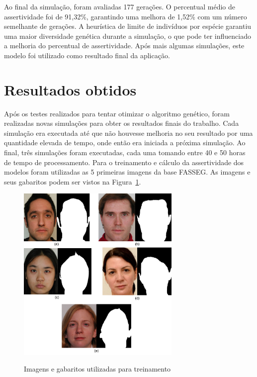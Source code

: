 \documentclass[12pt,oneside,a4paper,english,french,spanish,brazil,]{abntex2}
\begin{document}
Ao final da simulação, foram avaliadas 177 gerações. O percentual médio de assertividade foi de 91,32\%, garantindo uma melhora de 1,52\% com um número semelhante de gerações. A heurística de limite de indivíduos por espécie garantiu uma maior diversidade genética durante a simulação, o que pode ter influenciado a melhoria do percentual de assertividade. Após mais algumas simulações, este modelo foi utilizado como resultado final da aplicação.

\section{Resultados obtidos}

Após os testes realizados para tentar otimizar o algoritmo genético, foram realizadas novas simulações para obter os resultados finais do trabalho. Cada simulação era executada até que não houvesse melhoria no seu resultado por uma quantidade elevada de tempo, onde então era iniciada a próxima simulação. Ao final, três simulações foram executadas, cada uma tomando entre 40 e 50 horas de tempo de processamento. Para o treinamento e cálculo da assertividade dos modelos foram utilizadas as 5 primeiras imagens da base FASSEG. As imagens e seus gabaritos podem ser vistos na Figura~\ref{fig:DES_Imagens}.

\begin{figure}[ht]
\centering
\caption{Imagens e gabaritos utilizadas para treinamento}
\includegraphics[width=0.7\textwidth]{imagens/DES_Imagens.pdf}
\label{fig:DES_Imagens}
\end{figure}
\end{document}
